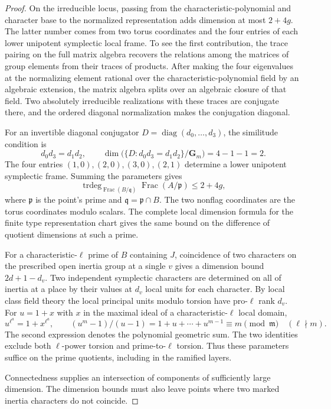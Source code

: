 \begin{proof}
On the irreducible locus,
passing from the characteristic-polynomial and character
base to the normalized representation adds dimension at
most \(2+4g\). The latter number comes from two torus
coordinates and the four entries of each lower unipotent
symplectic local frame. To see the first contribution, the
trace pairing on the full matrix algebra recovers the
relations among the matrices of group elements from their
traces of products. After making the four eigenvalues at the
normalizing element rational over the characteristic-polynomial
field by an algebraic extension, the matrix algebra splits
over an algebraic closure of that field. Two absolutely
irreducible realizations with these traces are conjugate
there, and the ordered diagonal normalization makes the
conjugation diagonal.

For an invertible diagonal conjugator \(D=\operatorname{diag}(d_0,\ldots,d_3)\), the similitude condition is
\[
 d_0d_3=d_1d_2,\qquad
 \dim\bigl(\{D:d_0d_3=d_1d_2\}/\mathbf G_m\bigr)=4-1-1=2 .
\]
The four entries \((1,0),(2,0),(3,0),(2,1)\) determine a
lower unipotent symplectic frame. Summing the parameters gives
\[
    \operatorname{trdeg}_{\operatorname{Frac}(B/\mathfrak q)}
        \operatorname{Frac}(A/\mathfrak p)\le 2+4g ,
\]
where \(\mathfrak p\) is the point's prime and
\(\mathfrak q=\mathfrak p\cap B\). The two nonflag coordinates
are the torus coordinates modulo scalars. The complete local dimension
formula for the finite type representation chart gives the
same bound on the difference of quotient dimensions at such
a prime.

For a characteristic-\(\ell\) prime of \(B\) containing
\(J\), coincidence of two characters on the prescribed
open inertia group at a single \(v\) gives a dimension
bound \(2d+1-d_v\). Two independent symplectic characters
are determined on all of inertia at a place by their values
at \(d_v\) local units for each character. By local class
field theory the local principal units modulo torsion have
pro-\(\ell\) rank \(d_v\). For \(u=1+x\) with \(x\) in the maximal ideal of a characteristic-\(\ell\) local domain,
\[
 u^{\ell^a}=1+x^{\ell^a},\qquad
 (u^m-1)/(u-1)=1+u+\cdots+u^{m-1}\equiv m\pmod{\mathfrak m}
 \quad (\ell\nmid m).
\]
The second expression denotes the polynomial geometric sum. The two identities exclude both \(\ell\)-power torsion and prime-to-\(\ell\) torsion. Thus these parameters suffice on the prime quotients, including in the ramified layers.

Connectedness supplies an intersection of components of sufficiently large dimension. The dimension bounds must also leave points where two marked inertia characters do not coincide.



\end{proof}

